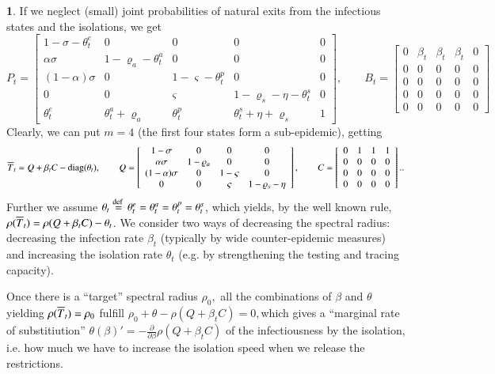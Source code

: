 \documentclass[english]{elsarticle}
\theoremstyle{plain}
\theoremstyle{remark}
\theoremstyle{plain}
\theoremstyle{definition}
\newtheorem{example}[thm]{\protect\examplename}
\providecommand{\examplename}{Example}
\begin{document}
\begin{example}
If we neglect (small) joint probabilities of natural exits from the
infectious states and the isolations, we get 
\[
P_{t}=\left[\begin{array}{ccccc}
1-\sigma-\theta_{t}^{e} & 0 & 0 & 0 & 0\\
\alpha\sigma & 1-\varrho_{a}-\theta_{t}^{a} & 0 & 0 & 0\\
(1-\alpha)\sigma & 0 & 1-\varsigma-\theta_{t}^{p} & 0 & 0\\
0 & 0 & \varsigma & 1-\varrho_{s}-\eta-\theta_{t}^{s} & 0\\
\theta_{t}^{e} & \theta_{t}^{a}+\varrho_{a} & \theta_{t}^{p} & \theta_{t}^{s}+\eta+\varrho_{s} & 1
\end{array}\right],\qquad B_{t}=\left[\begin{array}{ccccc}
0 & \beta_{t} & \beta_{t} & \beta_{t} & 0\\
0 & 0 & 0 & 0 & 0\\
0 & 0 & 0 & 0 & 0\\
0 & 0 & 0 & 0 & 0\\
0 & 0 & 0 & 0 & 0
\end{array}\right]
\]
Clearly, we can put $m=4$ (the first four states form a sub-epidemic),
getting 
\[
\overline{T}_{t}=Q+\beta_{t}C-\mathrm{diag}(\theta_{t}),\qquad Q=\left[\begin{array}{cccc}
1-\sigma & 0 & 0 & 0\\
\alpha\sigma & 1-\varrho_{a} & 0 & 0\\
(1-\alpha)\sigma & 0 & 1-\varsigma & 0\\
0 & 0 & \varsigma & 1-\varrho_{s}-\eta
\end{array}\right],\qquad C=\left[\begin{array}{cccc}
0 & 1 & 1 & 1\\
0 & 0 & 0 & 0\\
0 & 0 & 0 & 0\\
0 & 0 & 0 & 0
\end{array}\right]..
\]
Further we assume $\theta_{t}\stackrel{\text{def }}{=}\theta_{t}^{e}=\theta_{t}^{a}=\theta_{t}^{p}=\theta_{t}^{s}$,
which yields, by the well known rule, $\rho(\overline{T}_{t})=\rho(Q+\beta_{t}C)-\theta_{t}$.
We consider two ways of decreasing the spectral radius: decreasing
the infection rate $\beta_{t}$ (typically by wide counter-epidemic
measures) and increasing the isolation rate $\theta_{t}$ (e.g. by
strengthening the testing and tracing capacity).

Once there is a ``target'' spectral radius $\rho_{0},$ all the
combinations of $\beta$ and $\theta$ yielding $\rho(\overline{T}_{t})=\rho_{0}$
fulfill $\rho_{0}+\theta-\rho(Q+\beta_{t}C)=0,$which gives a ``marginal
rate of substitiution'' $\theta(\beta)'=-\frac{\partial}{\partial\beta}\rho(Q+\beta_{t}C)$
of the infectiousness by the isolation, i.e. how much we have to increase
the isolation speed when we release the restrictions.
\end{example}
\end{document}
